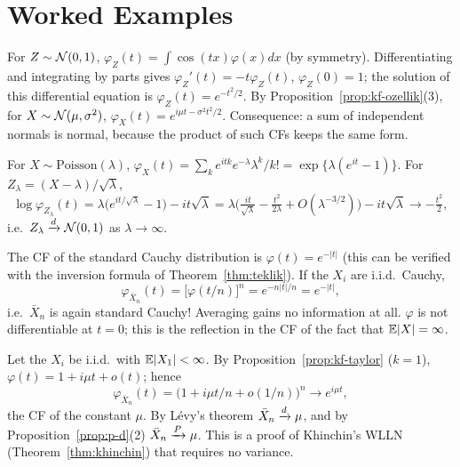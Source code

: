\documentclass[main.tex]{subfiles}
\begin{document}
\section{Worked Examples}

\begin{example}\label{ex:normal-kf}
For $Z\sim\mathcal{N}(0,1)$, $\varphi_Z(t)=\int\cos(tx)\varphi(x)dx$ (by symmetry). Differentiating and integrating by parts gives $\varphi_Z'(t)=-t\varphi_Z(t)$, $\varphi_Z(0)=1$; the solution of this differential equation is $\varphi_Z(t)=e^{-t^2/2}$. By Proposition~\ref{prop:kf-ozellik}(3), for $X\sim\mathcal{N}(\mu,\sigma^2)$, $\varphi_X(t)=e^{i\mu t-\sigma^2t^2/2}$. Consequence: a sum of independent normals is normal, because the product of such CFs keeps the same form.
\end{example}

\begin{example}
For $X\sim\text{Poisson}(\lambda)$, $\varphi_X(t)=\sum_k e^{itk}e^{-\lambda}\lambda^k/k!=\exp\{\lambda(e^{it}-1)\}$. For $Z_\lambda=(X-\lambda)/\sqrt\lambda$,
\[
\log\varphi_{Z_\lambda}(t)=\lambda\big(e^{it/\sqrt\lambda}-1\big)-it\sqrt\lambda=\lambda\Big(\tfrac{it}{\sqrt\lambda}-\tfrac{t^2}{2\lambda}+O(\lambda^{-3/2})\Big)-it\sqrt\lambda\to-\tfrac{t^2}{2},
\]
i.e.\ $Z_\lambda\xrightarrow{d}\mathcal{N}(0,1)$ as $\lambda\to\infty$.
\end{example}

\begin{example}\label{ex:cauchy-kf}
The CF of the standard Cauchy distribution is $\varphi(t)=e^{-|t|}$ (this can be verified with the inversion formula of Theorem~\ref{thm:teklik}). If the $X_i$ are i.i.d.\ Cauchy,
\[
\varphi_{\bar X_n}(t)=\big[\varphi(t/n)\big]^n=e^{-n|t|/n}=e^{-|t|},
\]
i.e.\ $\bar X_n$ is again standard Cauchy! Averaging gains no information at all. $\varphi$ is not differentiable at $t=0$; this is the reflection in the CF of the fact that $\mathbb{E}|X|=\infty$.
\end{example}

\begin{example}\label{ex:wlln-kf}
Let the $X_i$ be i.i.d.\ with $\mathbb{E}|X_1|<\infty$. By Proposition~\ref{prop:kf-taylor} ($k=1$), $\varphi(t)=1+i\mu t+o(t)$; hence
\[
\varphi_{\bar X_n}(t)=\big(1+i\mu t/n+o(1/n)\big)^n\to e^{i\mu t},
\]
the CF of the constant $\mu$. By Lévy's theorem $\bar X_n\xrightarrow{d}\mu$, and by Proposition~\ref{prop:p-d}(2) $\bar X_n\xrightarrow{P}\mu$. This is a proof of Khinchin's WLLN (Theorem~\ref{thm:khinchin}) that requires no variance.
\end{example}
\end{document}
